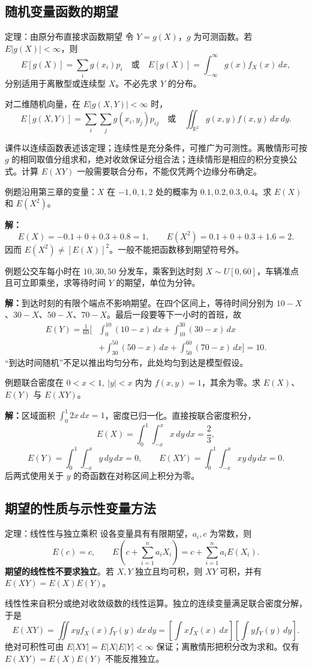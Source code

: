 \documentclass[UTF8,fontset=none,zihao=-4,a4paper]{ctexart}
\newcommand{\term}[1]{\textbf{#1}}
\newcommand{\example}[1]{\begin{infobox}{例题}#1\end{infobox}}
\newcommand{\solution}{\par\noindent\textbf{解：}}
\begin{document}
\subsection{随机变量函数的期望}
\begin{infobox}{定理：由原分布直接求函数期望}
令 $Y=g(X)$，$g$ 为可测函数。若 $E|g(X)|<\infty$，则
\[
E[g(X)]=\sum_i g(x_i)p_i
\quad\text{或}\quad
E[g(X)]=\int_{-\infty}^{\infty}g(x)f_X(x)\,dx,
\]
分别适用于离散型或连续型 $X$。不必先求 $Y$ 的分布。

对二维随机向量，在 $E|g(X,Y)|<\infty$ 时，
\[
E[g(X,Y)]=\sum_i\sum_j g(x_i,y_j)p_{ij}
\quad\text{或}\quad
\iint_{\mathbb R^2}g(x,y)f(x,y)\,dx\,dy.
\]
\end{infobox}
课件以连续函数表述该定理；连续性是充分条件，可推广为可测性。离散情形可按 $g$ 的相同取值分组求和，绝对收敛保证分组合法；连续情形是相应的积分变换公式。计算 $E(XY)$ 一般需要联合分布，不能仅凭两个边缘分布确定。
\example{沿用第三章的变量：$X$ 在 $-1,0,1,2$ 处的概率为 $0.1,0.2,0.3,0.4$。求 $E(X)$ 和 $E(X^2)$。}
\solution
\[
E(X)=-0.1+0+0.3+0.8=1,
\qquad E(X^2)=0.1+0+0.3+1.6=2.
\]
因而 $E(X^2)\ne[E(X)]^2$。一般不能把函数移到期望符号外。
\example{公交车每小时在 $10,30,50$ 分发车，乘客到达时刻 $X\sim U[0,60]$，车辆准点且可立即乘坐，求等待时间 $Y$ 的期望，单位为分钟。}
\solution 到达时刻的有限个端点不影响期望。在四个区间上，等待时间分别为 $10-X$、$30-X$、$50-X$、$70-X$。最后一段要等下一小时的首班，故
\begin{align*}
E(Y)=\frac1{60}\bigg[&\int_0^{10}(10-x)\,dx+\int_{10}^{30}(30-x)\,dx\\
&+\int_{30}^{50}(50-x)\,dx+\int_{50}^{60}(70-x)\,dx\bigg]
=10.
\end{align*}
“到达时间随机”不足以推出均匀分布，此处均匀到达是模型假设。
\example{联合密度在 $0<x<1,\ |y|<x$ 内为 $f(x,y)=1$，其余为零。求 $E(X)$、$E(Y)$ 与 $E(XY)$。}
\solution 区域面积 $\int_0^1 2x\,dx=1$，密度已归一化。直接按联合密度积分，
\[
E(X)=\int_0^1\int_{-x}^x x\,dy\,dx=\frac23,
\]
\[
E(Y)=\int_0^1\int_{-x}^x y\,dy\,dx=0,
\qquad E(XY)=\int_0^1\int_{-x}^x xy\,dy\,dx=0.
\]
后两式使用关于 $y$ 的奇函数在对称区间上积分为零。

\subsection{期望的性质与示性变量方法}
\begin{infobox}{定理：线性性与独立乘积}
设各变量具有有限期望，$a_i,c$ 为常数，则
\[
E(c)=c,\qquad E\left(c+\sum_{i=1}^n a_iX_i\right)
=c+\sum_{i=1}^n a_iE(X_i).
\]
\term{期望的线性性不要求独立}。若 $X,Y$ 独立且均可积，则 $XY$ 可积，并有 $E(XY)=E(X)E(Y)$。
\end{infobox}
线性性来自积分或绝对收敛级数的线性运算。独立的连续变量满足联合密度分解，于是
\[
E(XY)=\iint xyf_X(x)f_Y(y)\,dx\,dy
=\left[\int xf_X(x)\,dx\right]\left[\int yf_Y(y)\,dy\right].
\]
绝对可积性可由 $E|XY|=E|X|E|Y|<\infty$ 保证；离散情形把积分改为求和。仅有 $E(XY)=E(X)E(Y)$ 不能反推独立。
\end{document}
